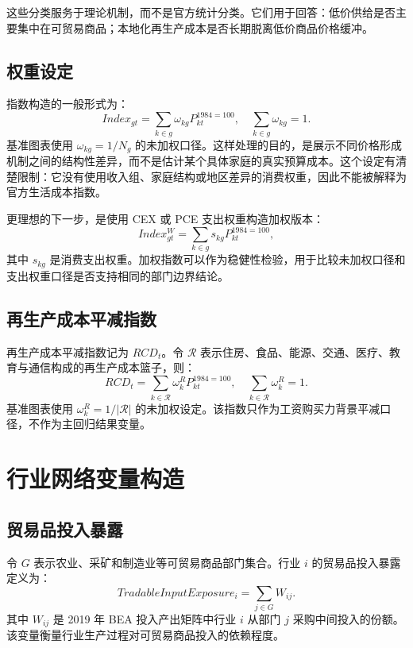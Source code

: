 \documentclass[12pt,a4paper,fontset=none]{ctexart}
\begin{document}
这些分类服务于理论机制，而不是官方统计分类。它们用于回答：低价供给是否主要集中在可贸易商品；本地化再生产成本是否长期脱离低价商品价格缓冲。

\subsection{权重设定}

指数构造的一般形式为：
\begin{equation}
Index_{gt}=\sum_{k\in g}\omega_{kg}P^{1984=100}_{kt},
\quad
\sum_{k\in g}\omega_{kg}=1.
\end{equation}
基准图表使用 \(\omega_{kg}=1/N_g\) 的未加权口径。这样处理的目的，是展示不同价格形成机制之间的结构性差异，而不是估计某个具体家庭的真实预算成本。这个设定有清楚限制：它没有使用收入组、家庭结构或地区差异的消费权重，因此不能被解释为官方生活成本指数。

更理想的下一步，是使用 CEX 或 PCE 支出权重构造加权版本：
\begin{equation}
Index^{W}_{gt}=\sum_{k\in g}s_{kg}P^{1984=100}_{kt},
\end{equation}
其中 \(s_{kg}\) 是消费支出权重。加权指数可以作为稳健性检验，用于比较未加权口径和支出权重口径是否支持相同的部门边界结论。

\subsection{再生产成本平减指数}

再生产成本平减指数记为 \(RCD_t\)。令 \(\mathcal R\) 表示住房、食品、能源、交通、医疗、教育与通信构成的再生产成本篮子，则：
\begin{equation}
RCD_t=\sum_{k\in \mathcal R}\omega^R_k P^{1984=100}_{kt},
\quad
\sum_{k\in \mathcal R}\omega^R_k=1.
\end{equation}
基准图表使用 \(\omega^R_k=1/|\mathcal R|\) 的未加权设定。该指数只作为工资购买力背景平减口径，不作为主回归结果变量。

\section{行业网络变量构造}

\subsection{贸易品投入暴露}

令 \(G\) 表示农业、采矿和制造业等可贸易商品部门集合。行业 \(i\) 的贸易品投入暴露定义为：
\begin{equation}
TradableInputExposure_i=\sum_{j\in G}W_{ij}.
\end{equation}
其中 \(W_{ij}\) 是 2019 年 BEA 投入产出矩阵中行业 \(i\) 从部门 \(j\) 采购中间投入的份额。该变量衡量行业生产过程对可贸易商品投入的依赖程度。
\end{document}
